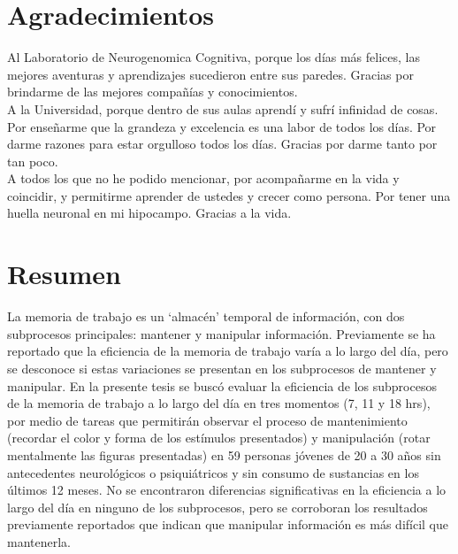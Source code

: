 \documentclass[12pt,letterpaper,final]{article}
\renewenvironment{acknowledgements}
{\newpage\section*{Agradecimientos}\begin{singlespace}\normalsize}
	{\end{singlespace}\par\newpage}
\begin{document}
\begin{acknowledgements}
Al Laboratorio de Neurogenomica Cognitiva, porque los días más felices, las mejores aventuras y aprendizajes sucedieron entre sus paredes. Gracias por brindarme de las mejores compañías y conocimientos. \\

A la Universidad, porque dentro de sus aulas aprendí y sufrí infinidad de cosas. Por enseñarme que la grandeza y excelencia es una labor de todos los días. Por darme razones para estar orgulloso todos los días.
Gracias por darme tanto por tan poco. \\


A todos los que no he podido mencionar, por acompañarme en la vida y coincidir, y permitirme aprender de ustedes y crecer como persona. Por tener una huella neuronal en mi hipocampo. Gracias a la vida.\\



\end{acknowledgements}


\tableofcontents

\clearpage

  


\newpage
{}

\doublespacing


\section*{Resumen}

La memoria de trabajo es un `almacén' temporal de información, con dos subprocesos principales: mantener y manipular información. Previamente se ha reportado que la eficiencia de la memoria de trabajo varía a lo largo del día, pero se desconoce si estas variaciones se presentan en los subprocesos de mantener y manipular. En la presente tesis se buscó evaluar la eficiencia de los subprocesos de la memoria de trabajo a lo largo del día en tres momentos (7, 11 y 18 hrs), por medio de tareas que permitirán observar el proceso de mantenimiento (recordar el color y forma de los estímulos presentados) y manipulación (rotar mentalmente las figuras presentadas) en 59 personas jóvenes de 20 a 30 años sin antecedentes neurológicos o psiquiátricos y sin consumo de sustancias en los últimos 12 meses. No se encontraron diferencias significativas en la eficiencia a lo largo del día en ninguno de los subprocesos, pero se corroboran los resultados previamente reportados que indican que manipular información es más difícil que mantenerla.
\newpage
\end{document}
